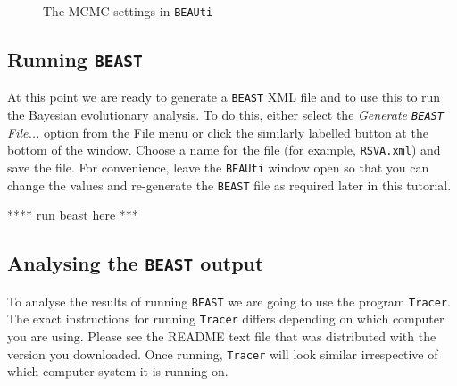 \documentclass[cup7b, english]{cupbook}
\begin{document}
\begin{figure}[htbp]
\begin{center}
\leavevmode
{}
\end{center}
\caption{The MCMC settings in \texttt{BEAUti}}
\label{fig:figure4}
\end{figure}

\subsection{Running \texttt{BEAST}}

At this point we are ready to generate a \texttt{BEAST} XML file and to use this to run the Bayesian
evolutionary analysis. To do this, either select the {\it Generate \texttt{BEAST} File...} option
from the File menu or click the similarly labelled button at the bottom of the window.
Choose a name for the file (for example, \texttt{RSVA.xml}) and save the file. For
convenience, leave the \texttt{BEAUti} window open so that you can change the values and re-generate
the \texttt{BEAST} file as required later in this tutorial.

**** run beast here ***


\subsection{Analysing the \texttt{BEAST} output}

To analyse the results of running \texttt{BEAST} we are going to use the program \texttt{Tracer}.
The exact instructions for running \texttt{Tracer} differs depending
on which computer you are using. Please see the README text file that was distributed with the
version you downloaded. Once running, \texttt{Tracer} will look similar irrespective of which computer system
it is running on.
\end{document}
